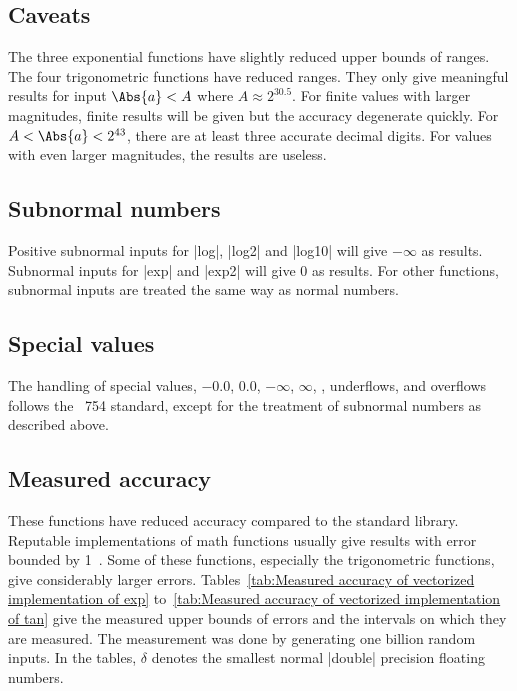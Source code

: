 \subsection{Caveats}
\label{sub:Caveats}

The three exponential functions have slightly reduced upper bounds of ranges.
The four trigonometric functions have reduced ranges. They only give meaningful
results for input $\Abs{a} < A$ where $A \approx 2^{30.5}$. For finite values
with larger magnitudes, finite results will be given but the accuracy
degenerate quickly. For $A < \Abs{a} < 2^{43}$, there are at least three
accurate decimal digits. For values with even larger magnitudes, the results
are useless.

\subsection{Subnormal numbers}
\label{sub:Subnormal numbers}

Positive subnormal inputs for |log|, |log2| and |log10| will give $-\infty$ as
results. Subnormal inputs for |exp| and |exp2| will give $0$ as results. For
other functions, subnormal inputs are treated the same way as normal numbers.

\subsection{Special values}
\label{sub:Special values}

The handling of special values, $-0.0$, $0.0$, $-\infty$, $\infty$, \nan,
underflows, and overflows follows the \ieee~754 standard, except for the
treatment of subnormal numbers as described above.

\subsection{Measured accuracy}
\label{sub:Measured accuracy}

These functions have reduced accuracy compared to the standard library.
Reputable implementations of math functions usually give results with error
bounded by 1~\ulp. Some of these functions, especially the trigonometric
functions, give considerably larger errors. Tables~\ref{tab:Measured accuracy
  of vectorized implementation of exp} to~\ref{tab:Measured accuracy of
  vectorized implementation of tan} give the measured upper bounds of errors
and the intervals on which they are measured. The measurement was done by
generating one billion random inputs. In the tables, $\delta$ denotes the
smallest normal |double| precision floating numbers.

